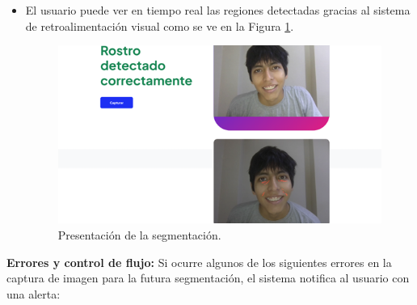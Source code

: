 \begin{itemize}
\item El usuario puede ver en tiempo real las regiones detectadas gracias al sistema de retroalimentación visual como se ve en la Figura \ref{fig:presseg}.

\begin{figure}[H]
      \centering
      \includegraphics[width=1\textwidth]{4/figures/PresSeg.png}
      \caption{Presentación de la segmentación.}
      \label{fig:presseg}
    \end{figure}

  \end{itemize}
\textbf{Errores y control de flujo:}
Si ocurre algunos de los siguientes errores en la captura de imagen para la futura segmentación, el sistema notifica al usuario con una alerta:

